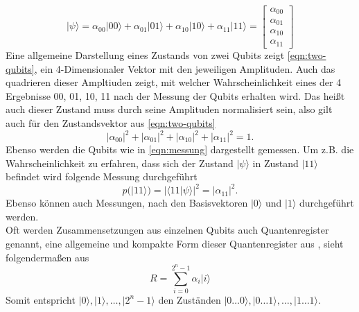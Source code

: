 \begin{equation}\label{eqn:two-qubits}
|\psi \rangle = \alpha_{00} |00\rangle + \alpha_{01} |01\rangle + \alpha_{10} |10\rangle + \alpha_{11} |11\rangle = \begin{bmatrix} \alpha_{00} \\ \alpha_{01} \\ \alpha_{10} \\ \alpha_{11} \end{bmatrix}
\end{equation}
Eine allgemeine Darstellung eines Zustands von zwei Qubits zeigt \ref{eqn:two-qubits}, ein 4-Dimensionaler Vektor mit den jeweiligen Amplituden. Auch das quadrieren dieser Ampltiuden zeigt, mit welcher Wahrscheinlichkeit eines der 4 Ergebnisse 00, 01, 10, 11 nach der Messung der Qubits erhalten wird.
Das hei\ss t auch dieser Zustand muss durch seine Amplituden normalisiert sein, also gilt auch f\"ur den Zustandsvektor aus \ref{eqn:two-qubits}
\begin{equation}
|\alpha_{00}|^2+|\alpha_{01}|^2+|\alpha_{10}|^2+|\alpha_{11}|^2 = 1 .
\end{equation}
Ebenso werden die Qubits wie in \ref{eqn:messung} dargestellt gemessen. Um z.B. die Wahrscheinlichkeit zu erfahren, dass sich der Zustand $|\psi \rangle$ in Zustand $|11\rangle$ befindet wird folgende Messung durchgef\"uhrt
\begin{equation}
p(|11\rangle) = |\langle 11| \psi  \rangle|^2 = |\alpha_{11}|^2.
\end{equation}
Ebenso k\"onnen auch Messungen, nach den Basisvektoren $|0 \rangle$ und $| 1\rangle$ durchgef\"uhrt werden.
\\
Oft werden Zusammensetzungen aus einzelnen Qubits auch Quantenregister genannt, eine allgemeine und kompakte Form dieser Quantenregister aus \cite{Homeister-2022}, sieht folgenderma\ss en aus
\begin{equation}
R = \sum\limits_{i=0}^{2^{n}-1} \alpha_i |i\rangle
\end{equation}
Somit entspricht $|0\rangle, |1\rangle, \dots, |2^{n}-1\rangle$ den Zust\"anden $|0\dots 0\rangle, |0\dots 1\rangle, \dots, |1\dots 1\rangle$.
